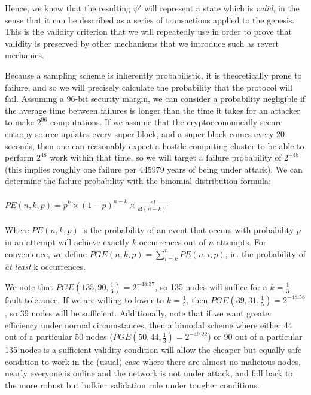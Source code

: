 \documentclass[11pt,a4paper]{report}
\theoremstyle{plain}
\theoremstyle{definition}
\theoremstyle{remark}
\begin{document}
Hence, we know that the resulting $\psi'$ will represent a state which is \emph{valid}, in the sense that it can be described as a series of transactions applied to the genesis. This is the validity criterion that we will repeatedly use in order to prove that validity is preserved by other mechanisms that we introduce such as revert mechanics.

Because a sampling scheme is inherently probabilistic, it is theoretically prone to failure, and so we will precisely calculate the probability that the protocol will fail. Assuming a 96-bit security margin, we can consider a probability negligible if the average time between failures is longer than the time it takes for an attacker to make $2^{96}$ computations. If we assume that the cryptoeconomically secure entropy source updates every super-block, and a super-block comes every 20 seconds, then one can reasonably expect a hostile computing cluster to be able to perform $2^{48}$ work within that time, so we will target a failure probability of $2^{-48}$ (this implies roughly one failure per 445979 years of being under attack). We can determine the failure probability with the binomial distribution formula:
\\
\\
$PE(n, k, p) = p^k \times  (1-p)^{n-k} \times  \frac{n!}{k!(n-k)!}$
\\
\\
Where $PE(n, k, p)$ is the probability of an event that occurs with probability $p$ in an attempt will achieve exactly $k$ occurrences out of $n$ attempts. For convenience, we define $PGE(n, k, p) = \sum_{i=k}^n PE(n, i, p)$, ie. the probability of \emph{at least} k occurrences.

We note that $PGE(135, 90, \frac{1}{3}) = 2^{-48.37}$, so 135 nodes will suffice for a $k = \frac{1}{3}$ fault tolerance. If we are willing to lower to $k = \frac{1}{5}$, then $PGE(39, 31, \frac{1}{5}) = 2^{-48.58}$, so 39 nodes will be sufficient. Additionally, note that if we want greater efficiency under normal circumstances, then a bimodal scheme where either 44 out of a particular 50 nodes ($PGE(50, 44, \frac{1}{3}) = 2^{-49.22}$) or 90 out of a particular 135 nodes is a sufficient validity condition will allow the cheaper but equally safe condition to work in the (usual) case where there are almost no malicious nodes, nearly everyone is online and the network is not under attack, and fall back to the more robust but bulkier validation rule under tougher conditions.
\end{document}
